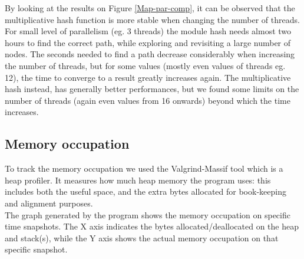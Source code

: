 \vspace{0.5cm}

By looking at the results on Figure \ref{Map-par-comp}, it can be observed that the multiplicative hash function is more stable when changing the number of threads.
For small level of parallelism (eg. 3 threads) the module hash needs almost two hours to find the correct path, while exploring and revisiting a large number of nodes.
The seconds needed to find a path decrease considerably when increasing the number of threads, but for some values (mostly even values of threads eg. 12), the time to converge to a result greatly increases again.
The multiplicative hash instead, has generally better performances, but we found some limits on the number of threads (again even values from 16 onwards) beyond which the time increases.


\subsection{Memory occupation}

To track the memory occupation we used the Valgrind-Massif \cite{bibValgrind} tool which is a heap profiler. It measures how much heap memory the program uses: this includes both the useful space,
and the extra bytes allocated for book-keeping and alignment purposes.
\\
The graph generated by the program shows the memory occupation on specific time snapshots. The X axis indicates the bytes allocated/deallocated on the heap and stack(s), while the Y axis shows the actual memory occupation on that specific snapshot.

\vspace{0.5cm}

